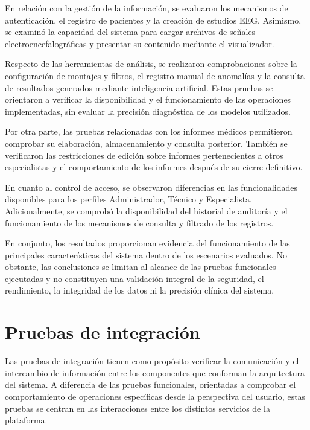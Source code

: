 En relación con la gestión de la información, se evaluaron los mecanismos de autenticación, el registro de pacientes y la creación de estudios EEG. Asimismo, se examinó la capacidad del sistema para cargar archivos de señales electroencefalográficas y presentar su contenido mediante el visualizador.

Respecto de las herramientas de análisis, se realizaron comprobaciones sobre la configuración de montajes y filtros, el registro manual de anomalías y la consulta de resultados generados mediante inteligencia artificial. Estas pruebas se orientaron a verificar la disponibilidad y el funcionamiento de las operaciones implementadas, sin evaluar la precisión diagnóstica de los modelos utilizados.

Por otra parte, las pruebas relacionadas con los informes médicos permitieron comprobar su elaboración, almacenamiento y consulta posterior. También se verificaron las restricciones de edición sobre informes pertenecientes a otros especialistas y el comportamiento de los informes después de su cierre definitivo.

En cuanto al control de acceso, se observaron diferencias en las funcionalidades disponibles para los perfiles Administrador, Técnico y Especialista. Adicionalmente, se comprobó la disponibilidad del historial de auditoría y el funcionamiento de los mecanismos de consulta y filtrado de los registros.

En conjunto, los resultados proporcionan evidencia del funcionamiento de las principales características del sistema dentro de los escenarios evaluados. No obstante, las conclusiones se limitan al alcance de las pruebas funcionales ejecutadas y no constituyen una validación integral de la seguridad, el rendimiento, la integridad de los datos ni la precisión clínica del sistema.


\section{Pruebas de integración}
\label{sec:pruebas_integracion}


Las pruebas de integración tienen como propósito verificar la comunicación y el intercambio de información entre los componentes que conforman la arquitectura del sistema. A diferencia de las pruebas funcionales, orientadas a comprobar el comportamiento de operaciones específicas desde la perspectiva del usuario, estas pruebas se centran en las interacciones entre los distintos servicios de la plataforma.

